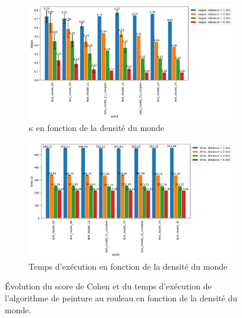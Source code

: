 \documentclass[francais,RandD]{rapportPFE}
\begin{document}
			\begin{figure}[h!]
				\centering
				\begin{subfigure}[t]{0.9\linewidth}
					\includegraphics[width=\linewidth]{graphics/peinture_au_rouleau-kappa_vs_world_for_each_d.png}
					\caption{$\kappa$ en fonction de la densité du monde}
					\label{fig:peinture_au_rouleau-kappa_vs_world}
				\end{subfigure}
				\hfill
				\begin{subfigure}[t]{0.9\linewidth}
						\includegraphics[width=\linewidth]{graphics/peinture_au_rouleau-time_vs_world_for_each_d.png}
						\caption{Temps d'exécution en fonction de la densité du monde}
						\label{fig:peinture_au_rouleau-time_vs_world}
				\end{subfigure}
				\caption{Évolution du score de Cohen et du temps d'exécution de l'algorithme de peinture au rouleau en fonction de la densité du monde.}
				\label{fig:peinture_au_rouleau-world}
			\end{figure}
\end{document}
